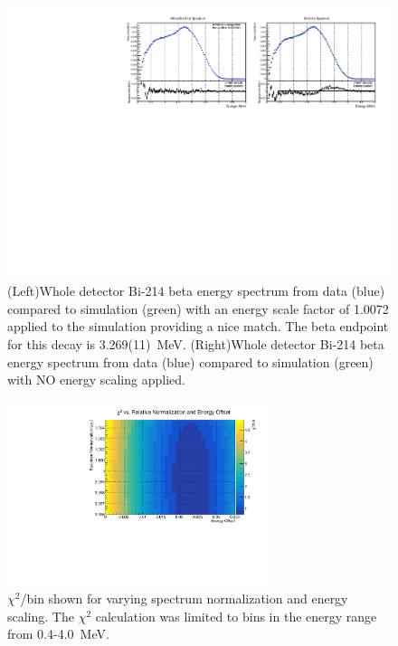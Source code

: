 \begin{figure}[!h]%
	\centering
	\includegraphics[width=1.0\textwidth]{figures/Bi214BetaSpectrumDataMC.pdf}
	\caption{\label{fig:BetaE214res}(Left)Whole detector Bi-214 beta energy spectrum from data (blue) compared to simulation (green) with an energy scale factor of 1.0072 applied to the simulation providing a nice match. The beta endpoint for this decay is 3.269(11)~MeV. (Right)Whole detector Bi-214 beta energy spectrum from data (blue) compared to simulation (green) with NO energy scaling applied.}
\end{figure}
\begin{figure}[!h]%
	\centering
	\includegraphics[width=0.68\textwidth]{figures/Bi214BetaSpectrumChisq.pdf}
	\caption{\label{fig:BetaE214Chisq}$\chi^2$/bin shown for varying spectrum normalization and energy scaling. The $\chi^2$ calculation was limited to bins in the energy range from 0.4-4.0~MeV.}
\end{figure}

